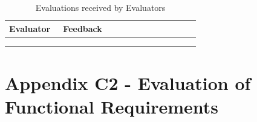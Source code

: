 
\vspace{-4mm}
\begin{longtable}{|p{0.26\linewidth}|p{0.66\linewidth}|}
\caption{Evaluations received by Evaluators}
\label{tab:evaluators-eval-feedback}
\\
\hline
\textbf{Evaluator} & \textbf{Feedback} \endfirsthead
\hline
&  \\
\hline
 & \\
\hline
 & \\
\hline
 & \\
\hline
\end{longtable}

\section*{Appendix C2 - Evaluation of Functional Requirements}

